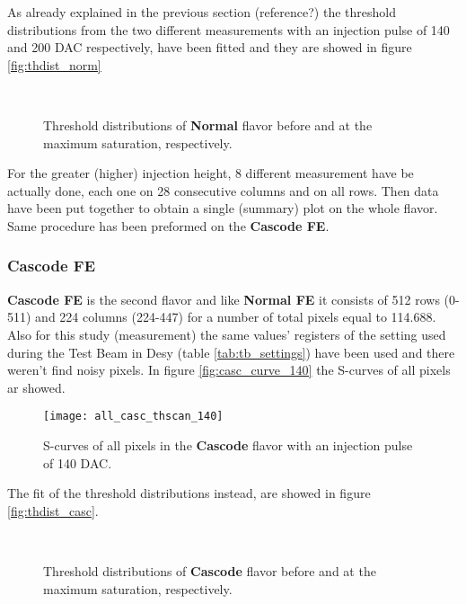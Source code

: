As already explained in the previous section (reference?) the threshold distributions from the two different measurements with an injection pulse of 140 and 200 DAC respectively, have been fitted and they are showed in figure \vref{fig:thdist_norm}

\begin{figure}[h!]
\centering
{}\quad
{}\\
\caption{Threshold distributions of \textbf{Normal} flavor before and at the maximum saturation, respectively.}
\label{fig:thdist_norm}
\end{figure}
 
For the greater (higher) injection height, 8 different measurement have be actually done, each one on 28 consecutive columns and on all rows. Then data have been put together to obtain a single (summary) plot on the whole flavor. Same procedure has been preformed on the \textbf{Cascode FE}.


\subsubsection{Cascode FE}

\textbf{Cascode FE} is the second flavor and like \textbf{Normal FE} it consists of 512 rows (0-511) and 224 columns (224-447) for a number of total pixels equal to 114.688. Also for this study (measurement) the same values' registers of the setting used during the Test Beam in Desy (table \vref{tab:tb_settings}) have been used and there weren't find noisy pixels. 
In figure \vref{fig:casc_curve_140} the S-curves of all pixels ar showed.

\begin{figure}[h!]
\centering
\texttt{[image: all\_casc\_thscan\_140]}
\caption{S-curves of all pixels in the \textbf{Cascode} flavor with an injection pulse of 140 DAC.}
\label{fig:casc_scurve_140}
\end{figure}

The fit of the threshold distributions instead, are showed in figure \vref{fig:thdist_casc}.

\begin{figure}[h!]
\centering
{}\quad
{}\\
\caption{Threshold distributions of \textbf{Cascode} flavor before and at the maximum saturation, respectively.}
\label{fig:thdist_casc}
\end{figure}


